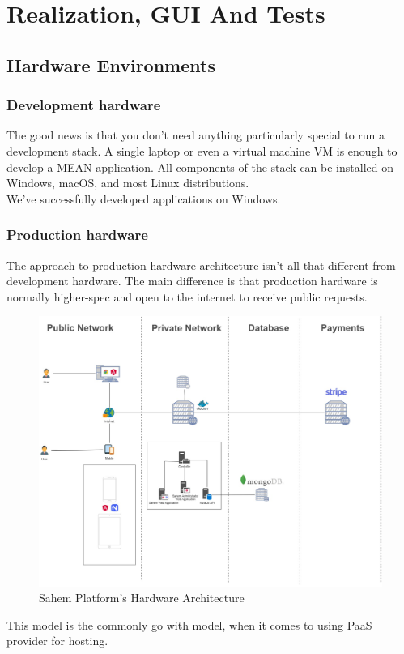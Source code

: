 

\setcounter{mtc}{11}

\chapter{Realization, GUI And Tests}%
\label{chap:chapter_four}
\minitoc

\section{Hardware Environments}

\subsection{Development hardware }
The good news is that you don’t need anything particularly special to run a development stack. A single laptop or even a virtual machine \ac{VM} is enough to develop a MEAN application. All components of the stack can be installed on Windows, macOS, and most Linux distributions.\\

We’ve successfully developed applications on Windows.\\

\subsection{Production hardware }
The approach to production hardware architecture isn’t all that different from development hardware. The main difference is that production hardware is normally higher-spec and open to the internet to receive public requests.\\

\begin{figure}[!ht]
      \centering
      \includegraphics[scale=0.30]{assets/architecturedrawio.jpg}
      \caption{Sahem Platform's Hardware Architecture}
      \label{fig:sahemarchitecturedrawio}
\end{figure}
This model is the commonly go with model, when it comes to using \ac{PaaS} provider for hosting.
